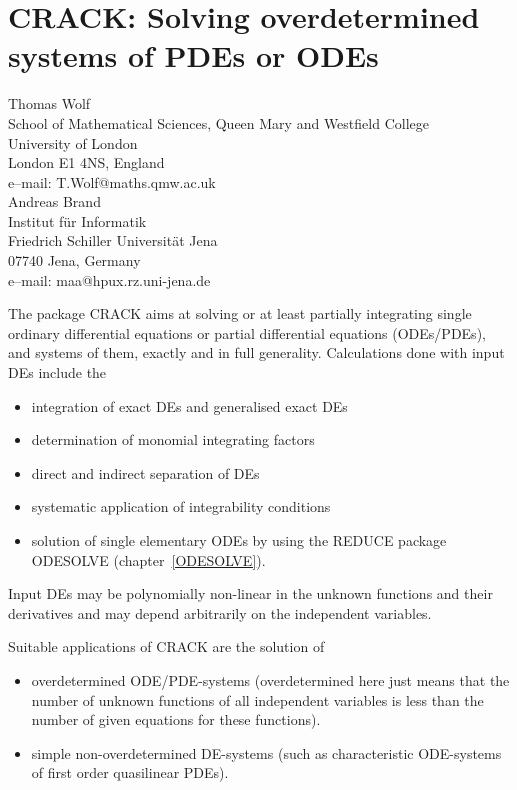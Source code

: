 \chapter[CRACK: Overdetermined systems of DEs]%
        {CRACK: Solving overdetermined systems of PDEs or ODEs}
\label{CRACK}

{\footnotesize
\begin{center}
Thomas Wolf \\
School of Mathematical Sciences, Queen Mary and Westfield College \\
University of London \\
London E1 4NS, England \\[0.05in]
e--mail: T.Wolf@maths.qmw.ac.uk \\ [0.10in]
Andreas Brand \\ 
Institut f\"{u}r Informatik \\
Friedrich Schiller Universit\"{a}t Jena \\
07740 Jena, Germany \\[0.05in]
e--mail: maa@hpux.rz.uni-jena.de
\end{center}
}

The package CRACK aims at solving or at least partially
integrating single ordinary differential equations or partial
differential equations (ODEs/PDEs), and systems of them, exactly and in full 
generality.  Calculations done with input DEs include the
\begin{itemize}
\item integration of exact DEs and generalised exact DEs 
\item determination of monomial integrating factors
\item direct and indirect separation of DEs
\item systematic application of integrability conditions
\item solution of single elementary ODEs by using the REDUCE 
      package ODESOLVE (chapter~\ref{ODESOLVE}).
\end{itemize}
Input DEs may be polynomially non-linear in the unknown functions
and their derivatives and may depend arbitrarily on the independent
variables.

Suitable applications of CRACK are the solution of
\begin{itemize}
\item overdetermined ODE/PDE-systems (overdetermined here just means
that the number of unknown functions of all independent variables
is less than the number of given equations for these functions).
\item simple non-overdetermined DE-systems (such as characteristic 
ODE-systems of first order quasilinear PDEs). 
\end{itemize}

